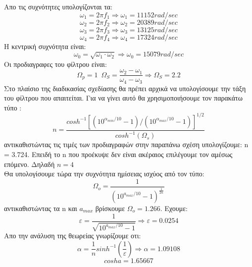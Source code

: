 \documentclass{article}
\begin{document}
{Απο τις συχνότητες υπολογίζονται τα:
\begin{equation*}
ω_1 = 2 π f_1 \Rightarrow  \boxed{ω_1 = 11152rad/sec}
\end{equation*}
\begin{equation*}
ω_2 = 2 π f_2 \Rightarrow  \boxed{ω_2 = 20389rad/sec}
\end{equation*}
\begin{equation*}
ω_3 = 2 π f_3 \Rightarrow  \boxed{ω_3 = 13125rad/sec}
\end{equation*}
\begin{equation*}
ω_4 = 2 π f_4 \Rightarrow  \boxed{ω_4 = 17324rad/sec}
\end{equation*}
H κεντρική συχνότητα είναι:
\begin{equation*}
ω_0 = \sqrt{ω_1 \cdot ω_2} \Rightarrow \boxed{ω_0 = 15079rad/sec}
\end{equation*}
Οι προδιαγραφες του φίλτρου είναι:
\begin{equation*}
\boxed{Ω_p = 1} \enspace Ω_S = \frac{ω_2 - ω_1}{ω_4 - ω_3} \Rightarrow \boxed{Ω_S = 2.2}
\end{equation*}
Στο πλαίσιο της διαδικασίας σχεδίασης θα πρέπει αρχικά να υπολογίσουμε την τάξη του φίλτρου που απαιτείται. Για να γίνει αυτό θα χρησιμοποιήσουμε τον παρακάτω τύπο :
\begin{equation*}
\boxed{n=\frac{cosh^{-1}[(10^{{α_{min}}/{10}}-1)/ (10^{{α_{max}}/{10}}-1)]^{1/2}}{cosh^{-1}(Ω_s)}
}
\end{equation*}
αντικαθιστώντας τις τιμές των προδιαγραφών στην παραπάνω σχέση υπολογίζουμε: n = 3.724. Επειδή το n που προέκυψε δεν είναι ακέραιος επιλέγουμε τον αμέσως επόμενο. Δηλαδή $\boxed{n=4}$ \\[0.1\baselineskip]
Θα υπολογίσουμε τώρα την συχνότητα ημίσειας ισχύος από τον τύπο:
\begin{equation*}
\boxed{
Ω_{o} = \frac{1}{ (10^{ a_{max}/10} - 1)^ \frac{1}{2n} }  }
\end{equation*} 
αντικαθιστώντας τα n και $a_{max}$ βρίσκουμε $\boxed{Ω_{o}=1.266}$.
Εχουμε:
\begin{equation*}
ε =\frac{1}{\sqrt{10^{a_{max}/10} -1}}  \Rightarrow \boxed{ε = 0.0254}
\end{equation*}
Απο την ανάλυση της θεωρείας γνωρίζουμε οτι: 
\begin{equation*}
α = \frac{1}{n}sinh^{-1}(\frac{1}{ε}) \Rightarrow \boxed{α = 1.09108}
\end{equation*}
\begin{equation*}
\boxed{cosha =1.65667} 

\end{equation*}}
\end{document}
